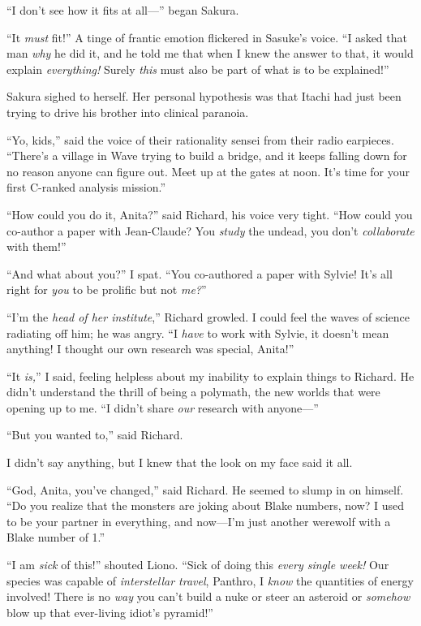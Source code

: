 “I don’t see how it fits at all—” began Sakura.

“It \emph{must} fit!” A tinge of frantic emotion flickered in Sasuke’s voice. “I asked that man \emph{why} he did it, and he told me that when I knew the answer to that, it would explain \emph{everything!} Surely \emph{this} must also be part of what is to be explained!”

Sakura sighed to herself. Her personal hypothesis was that Itachi had just been trying to drive his brother into clinical paranoia.

“Yo, kids,” said the voice of their rationality sensei from their radio earpieces. “There’s a village in Wave trying to build a bridge, and it keeps falling down for no reason anyone can figure out. Meet up at the gates at noon. It’s time for your first C-ranked analysis mission.”

\clearpage
{}

“How could you do it, Anita?” said Richard, his voice very tight. “How could you co-author a paper with Jean-Claude? You \emph{study} the undead, you don’t \emph{collaborate} with them!”

“And what about you?” I spat. “You co-authored a paper with Sylvie! It’s all right for \emph{you} to be prolific but not \emph{me?}”

“I’m the \emph{head of her institute},” Richard growled. I could feel the waves of science radiating off him; he was angry. “I \emph{have} to work with Sylvie, it doesn’t mean anything! I thought our own research was special, Anita!”

“It \emph{is,}” I said, feeling helpless about my inability to explain things to Richard. He didn’t understand the thrill of being a polymath, the new worlds that were opening up to me. “I didn’t share \emph{our} research with anyone—”

“But you wanted to,” said Richard.

I didn’t say anything, but I knew that the look on my face said it all.

“God, Anita, you’ve changed,” said Richard. He seemed to slump in on himself. “Do you realize that the monsters are joking about Blake numbers, now? I used to be your partner in everything, and now—I’m just another werewolf with a Blake number of 1.”


“I am \emph{sick} of this!” shouted Liono. “Sick of doing this \emph{every single week!} Our species was capable of \emph{interstellar travel}, Panthro, I \emph{know} the quantities of energy involved! There is no \emph{way} you can’t build a nuke or steer an asteroid or \emph{somehow} blow up that ever-living idiot’s pyramid!”


